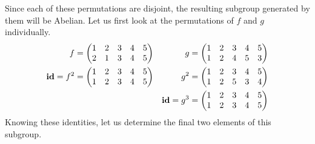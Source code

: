 \documentclass{article}
\begin{document}
Since each of these permutations are disjoint, the resulting subgroup generated by them will be Abelian. Let us first look at the permutations of $f$ and $g$ individually.
\begin{align*}
    f         & = \begin{pmatrix}
                      1 & 2 & 3 & 4 & 5 \\
                      2 & 1 & 3 & 4 & 5
                  \end{pmatrix} &
    g         & = \begin{pmatrix}
                      1 & 2 & 3 & 4 & 5 \\
                      1 & 2 & 4 & 5 & 3
                  \end{pmatrix}                                    \\
    \operatorname{\textbf{id}} = f^2 & = \begin{pmatrix}
                      1 & 2 & 3 & 4 & 5 \\
                      1 & 2 & 3 & 4 & 5
                  \end{pmatrix} &
    g^2       & = \begin{pmatrix}
                      1 & 2 & 3 & 4 & 5 \\
                      1 & 2 & 5 & 3 & 4
                  \end{pmatrix}                                    \\
              &                      & \operatorname{\textbf{id}} = g^3 & = \begin{pmatrix}
                                                         1 & 2 & 3 & 4 & 5 \\
                                                         1 & 2 & 3 & 4 & 5
                                                     \end{pmatrix}
\end{align*}
Knowing these identities, let us determine the final two elements of this subgroup.
\end{document}

